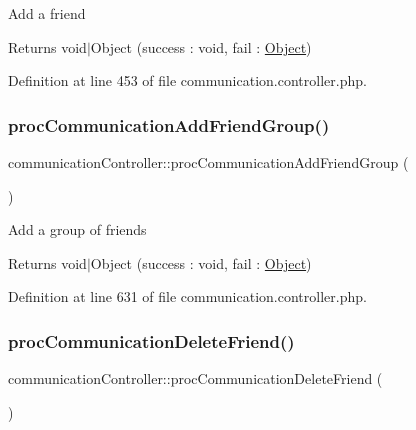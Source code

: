 Add a friend \begin{DoxyReturn}{Returns}
void$\vert$\+Object (success \+: void, fail \+: \hyperlink{classObject}{Object}) 
\end{DoxyReturn}


Definition at line 453 of file communication.\+controller.\+php.

\hypertarget{classcommunicationController_a903d152bacec7414ebd368daaae1ff8f}{}\label{classcommunicationController_a903d152bacec7414ebd368daaae1ff8f} 
\subsubsection{\texorpdfstring{proc\+Communication\+Add\+Friend\+Group()}{procCommunicationAddFriendGroup()}}
{\footnotesize\ttfamily communication\+Controller\+::proc\+Communication\+Add\+Friend\+Group (\begin{DoxyParamCaption}{ }\end{DoxyParamCaption})}

Add a group of friends \begin{DoxyReturn}{Returns}
void$\vert$\+Object (success \+: void, fail \+: \hyperlink{classObject}{Object}) 
\end{DoxyReturn}


Definition at line 631 of file communication.\+controller.\+php.

\hypertarget{classcommunicationController_a841c965fa92d8086b4d26fe2a0492f38}{}\label{classcommunicationController_a841c965fa92d8086b4d26fe2a0492f38} 
\subsubsection{\texorpdfstring{proc\+Communication\+Delete\+Friend()}{procCommunicationDeleteFriend()}}
{\footnotesize\ttfamily communication\+Controller\+::proc\+Communication\+Delete\+Friend (\begin{DoxyParamCaption}{ }\end{DoxyParamCaption})}

